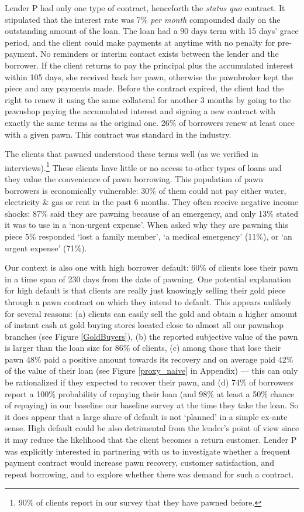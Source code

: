 \documentclass[oneside,11pt]{article}
\begin{document}
Lender P had only one type of contract, henceforth the \textit{status quo} contract. It stipulated that the interest rate was 7\% \textit{per month} compounded daily on the outstanding amount of the loan. The loan had a 90 days term with 15 days' grace period, and the client could make payments at anytime with no penalty for pre-payment. No reminders or interim contact exists between the lender and the borrower.  If the client returns to pay the principal plus the accumulated interest within 105 days, she received back her pawn, otherwise the pawnbroker kept the piece and any payments made. Before the contract expired, the client had the right to renew it  using the same collateral for another 3 months by going to the pawnshop paying the accumulated interest and signing a new contract with exactly the same terms as the original one.  26\% of borrowers renew at least once with a given pawn. This contract was standard in the industry.  


The clients that pawned understood these terms well (as we verified in interviews).\footnote{90\% of clients report in our survey that they have pawned before.} These clients have little or no access to other types of loans and they value the convenience of pawn borrowing.  This population of pawn borrowers is economically vulnerable:  30\% of them could not pay either water, electricity \& gas or rent in the past 6 months. They often receive negative income shocks: 87\% said they are pawning because of an emergency, and only 13\% stated it was to use in a `non-urgent expense'.  When asked why they are pawning this piece 5\% responded `lost a family member', `a medical emergency' (11\%), or `an urgent expense' (71\%).


Our context is also one with high borrower default: 60\% of clients lose their pawn in a time span of 230 days from the date of pawning.   One potential explanation for high default is that clients are really just knowingly selling their gold piece through a pawn contract on which they intend to default. This appears unlikely for several reasons: (a) clients can easily sell the gold and obtain a higher amount of instant cash at gold buying stores located close to almost all our pawnshop branches (see Figure \ref{GoldBuyers}), (b) the reported subjective value of the pawn is larger than the loan size for 86\% of clients, (c) among those that lose their pawn 48\% paid a positive amount towards its recovery and on average paid 42\% of the value of their loan (see Figure \ref{proxy_naive} in Appendix) --- this can only be rationalized if they expected to recover their pawn, and (d) 74\% of borrowers report a 100\% probability of repaying their loan (and 98\% at least a 50\% chance of repaying) in our baseline our baseline survey at the time they take the loan.  So it does appear that a large share of default is not `planned' in a simple ex-ante sense.  High default could be also detrimental from the lender's point of view since it may reduce the likelihood that the client becomes a return customer. Lender P was explicitly interested in  partnering with us to investigate whether a frequent payment contract would increase pawn recovery, customer satisfaction, and repeat borrowing, and to explore whether there was demand for such a contract. 
\end{document}
